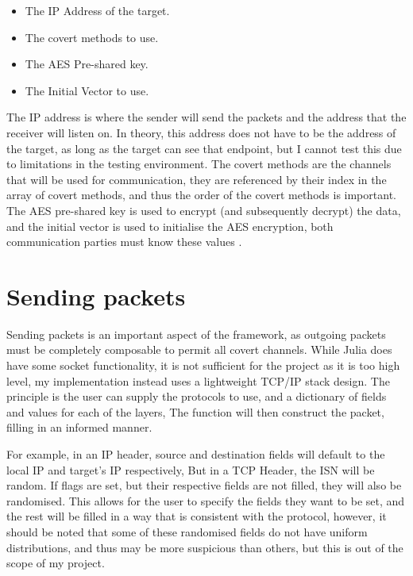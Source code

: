 \begin{itemize}
    \item The IP Address of the target.
    \item The covert methods to use.
    \item The AES Pre-shared key.
    \item The Initial Vector to use.
\end{itemize}

The IP address is where the sender will send the packets and the address that the receiver will listen on. In theory, this address does not have to be the address of the target, as long as the target can see that endpoint, but I cannot test this due to limitations in the testing environment. The covert methods are the channels that will be used for communication, they are referenced by their index in the array of covert methods, and thus the order of the covert methods is important.
The AES pre-shared key is used to encrypt (and subsequently decrypt) the data, and the initial vector is used to initialise the AES encryption, both communication parties must know these values \cite{GUCCA}.

\section{Sending packets}
\label{sec:sending_packets}

Sending packets is an important aspect of the framework, as outgoing packets must be completely composable to permit all covert channels. While Julia does have some socket functionality, it is not sufficient for the project as it is too high level, my implementation instead uses a lightweight TCP/IP stack design. The principle is the user can supply the protocols to use, and a dictionary of fields and values for each of the layers, The function will then construct the packet, filling in an informed manner.

For example, in an IP header, source and destination fields will default to the local IP and target's IP respectively, But in a TCP Header, the ISN will be random. If flags are set, but their respective fields are not filled, they will also be randomised. This allows for the user to specify the fields they want to be set, and the rest will be filled in a way that is consistent with the protocol, however, it should be noted that some of these randomised fields do not have uniform distributions, and thus may be more suspicious than others, but this is out of the scope of my project.
 
